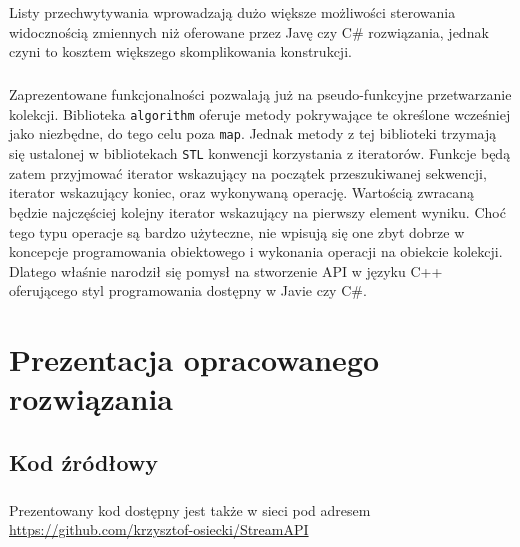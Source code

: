 \documentclass[a4paper,10pt]{report}
\begin{document}
    Listy przechwytywania wprowadzają dużo większe możliwości sterowania widocznością zmiennych niż oferowane przez Javę czy C\# rozwiązania, jednak czyni to kosztem większego skomplikowania konstrukcji.
\paragraph{}
Zaprezentowane funkcjonalności pozwalają już na pseudo-funkcyjne przetwarzanie kolekcji. Biblioteka \verb|algorithm| oferuje metody pokrywające te określone wcześniej jako niezbędne, do tego celu poza \verb|map|. Jednak metody z tej biblioteki trzymają się ustalonej w bibliotekach \verb|STL| konwencji korzystania z iteratorów. Funkcje będą zatem przyjmować iterator wskazujący na początek przeszukiwanej sekwencji, iterator wskazujący koniec, oraz wykonywaną operację. Wartością zwracaną będzie najczęściej kolejny iterator wskazujący na pierwszy element wyniku. Choć tego typu operacje są bardzo użyteczne, nie wpisują się one zbyt dobrze w koncepcje programowania obiektowego i wykonania operacji na obiekcie kolekcji. Dlatego właśnie narodził się pomysł na stworzenie API w języku C++ oferującego styl programowania dostępny w Javie czy C\#.
\chapter{Prezentacja opracowanego rozwiązania}
\section{Kod źródłowy}

\paragraph{}
Prezentowany kod dostępny jest także w sieci pod adresem \hyperref[https://github.com/krzysztof-osiecki/StreamAPI]{https://github.com/krzysztof-osiecki/StreamAPI}
\end{document}
